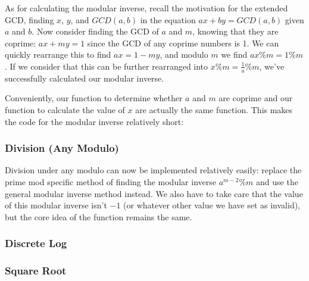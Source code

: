 As for calculating the modular inverse, recall the motivation for the extended GCD, finding $x$, $y$, and $GCD(a,b)$ in the equation $ax + by = GCD(a,b)$ given $a$ and $b$. Now consider finding the GCD of $a$ and $m$, knowing that they are coprime: $ax + my = 1$ since the GCD of any coprime numbers is 1. We can quickly rearrange this to find $ax = 1 - my$, and modulo $m$ we find $ax \% m = 1 \% m$. If we consider that this can be further rearranged into $x \% m = \frac{1}{a} \% m$, we've successfully calculated our modular inverse.

Conveniently, our function to determine whether $a$ and $m$ are coprime and our function to calculate the value of $x$ are actually the same function. This makes the code for the modular inverse relatively short:


\subsubsection{Division (Any Modulo)}

Division under any modulo can now be implemented relatively easily: replace the prime mod specific method of finding the modular inverse $a^{m-2}\%m$ and use the general modular inverse method instead. We also have to take care that the value of this modular inverse isn't $-1$ (or whatever other value we have set as invalid), but the core idea of the function remains the same.

\subsubsection{Discrete Log}

\subsubsection{Square Root}
